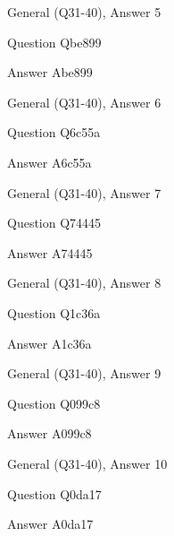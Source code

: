 \documentclass[11pt]{beamer}
\begin{document}
\begin{frame}[t]{General (Q31-40), Answer 5}
\vspace{2em}
\begin{block}{Question}
Qbe899
\end{block}
\pause{}
\begin{block}{Answer}
Abe899
\end{block}
\end{frame}
    

\begin{frame}[t]{General (Q31-40), Answer 6}
\vspace{2em}
\begin{block}{Question}
Q6c55a
\end{block}
\pause{}
\begin{block}{Answer}
A6c55a
\end{block}
\end{frame}
    

\begin{frame}[t]{General (Q31-40), Answer 7}
\vspace{2em}
\begin{block}{Question}
Q74445
\end{block}
\pause{}
\begin{block}{Answer}
A74445
\end{block}
\end{frame}
    

\begin{frame}[t]{General (Q31-40), Answer 8}
\vspace{2em}
\begin{block}{Question}
Q1c36a
\end{block}
\pause{}
\begin{block}{Answer}
A1c36a
\end{block}
\end{frame}
    

\begin{frame}[t]{General (Q31-40), Answer 9}
\vspace{2em}
\begin{block}{Question}
Q099c8
\end{block}
\pause{}
\begin{block}{Answer}
A099c8
\end{block}
\end{frame}
    

\begin{frame}[t]{General (Q31-40), Answer 10}
\vspace{2em}
\begin{block}{Question}
Q0da17
\end{block}
\pause{}
\begin{block}{Answer}
A0da17
\end{block}
\end{frame}
    
\end{document}
